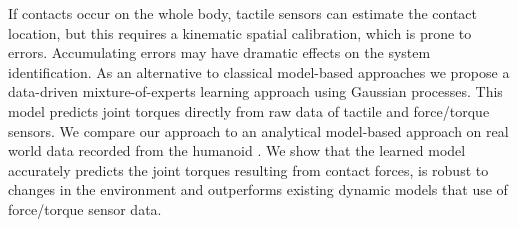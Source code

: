 If contacts occur on the whole body, tactile sensors can estimate the contact location, but this requires a kinematic spatial calibration, which is prone to errors. 
Accumulating errors may have dramatic effects on the system identification.
%
%
%
%
%
As an alternative to classical model-based approaches we propose a data-driven mixture-of-experts learning approach using Gaussian processes. 
This model predicts joint torques directly from raw data of tactile and force\slash torque sensors.
%
We compare our approach to an analytical model-based approach on real world data recorded from the humanoid \robot{}.
We show that the learned model accurately predicts the joint torques resulting from contact forces, is robust to changes in the environment and outperforms existing dynamic models that use of force\slash torque sensor data.